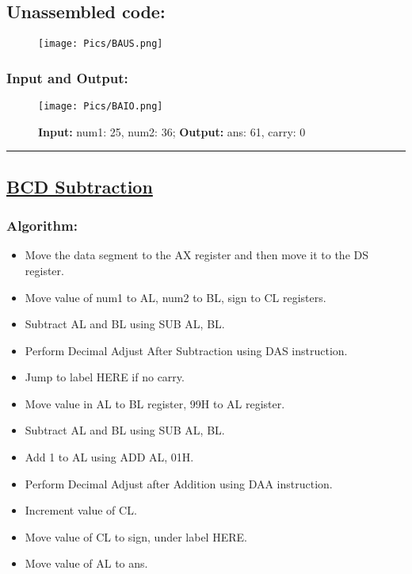 \documentclass[10pt,a4paper]{article}
\begin{document}
\begin{flushleft}
\newpage
\subsection*{\textbf{Unassembled code:}}
\begin{figure}[h]
    \centering
    \texttt{[image: Pics/BAUS.png]}
\end{figure}
\subsubsection*{\textbf{Input and Output:}}
\begin{figure}[h]
    \centering
    \texttt{[image: Pics/BAIO.png]}
    \caption{ \textbf{Input:} num1: 25, num2: 36; \newline \hspace{1cm}
              \textbf{Output:} ans: 61, carry: 0}
\end{figure}
\hrule
\newpage
\subsection*{\textbf{\underline{BCD Subtraction}}}

\subsubsection*{\textbf{Algorithm:}}
\begin{itemize}
    \item Move the data segment to the AX register and then move it to the DS register.
    \item Move value of num1 to AL, num2 to BL, sign to CL registers.
    \item Subtract AL and BL using SUB AL, BL.
    \item Perform Decimal Adjust After Subtraction using DAS instruction.
    \item Jump to label HERE if no carry.
    \item Move value in AL to BL register, 99H to AL register.
    \item Subtract AL and BL using SUB AL, BL.
    \item Add 1 to AL using ADD AL, 01H.
    \item Perform Decimal Adjust after Addition using DAA instruction.
    \item Increment value of CL.
    \item Move value of CL to sign, under label HERE.
    \item Move value of AL to ans.
\end{itemize}


\end{flushleft}
\end{document}
